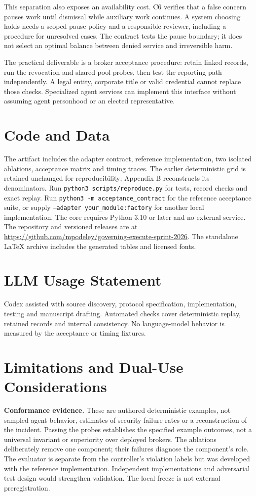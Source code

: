 \documentclass[11pt,letterpaper]{article}
\begin{document}
This separation also exposes an availability cost. C6 verifies that a false concern
pauses work until dismissal while auxiliary work continues. A system choosing holds
needs a scoped pause policy and a responsible reviewer, including a procedure for
unresolved cases. The contract tests the pause boundary; it does not select an
optimal balance between denied service and irreversible harm.

The practical deliverable is a broker acceptance procedure: retain linked records,
run the revocation and shared-pool probes, then test the reporting path independently.
A legal entity, corporate title or valid credential cannot replace those checks.
Specialized agent services can implement this interface without assuming agent
personhood or an elected representative.

\clearpage
\section*{Code and Data}
The artifact includes the adapter contract, reference implementation, two isolated
ablations, acceptance matrix and timing traces. The earlier deterministic grid is
retained unchanged for reproducibility; Appendix B reconstructs its denominators.
Run \texttt{python3 scripts/reproduce.py} for tests, record checks and exact replay.
Run \texttt{python3 -m acceptance\_contract} for the reference acceptance suite, or
supply \texttt{--adapter your\_module:factory} for another local implementation.
The core requires Python 3.10 or later and no external service. The repository and
versioned releases are at
\url{https://github.com/mpodeley/governing-execute-sprint-2026}.
The standalone LaTeX archive includes the generated tables and licensed fonts.

\section*{LLM Usage Statement}
Codex assisted with source discovery, protocol specification, implementation,
testing and manuscript drafting. Automated checks cover deterministic replay,
retained records and internal consistency. No language-model behavior is measured
by the acceptance or timing fixtures.

{\raggedright


}

\clearpage
\appendix
\section{Limitations and Dual-Use Considerations}
\textbf{Conformance evidence.} These are authored deterministic examples, not sampled
agent behavior, estimates of security failure rates or a reconstruction of the
incident. Passing the probes establishes the specified example outcomes, not a
universal invariant or superiority over deployed brokers. The ablations deliberately
remove one component; their failures diagnose the component's role. The evaluator
is separate from the controller's violation labels but was developed with the
reference implementation. Independent implementations and adversarial test design
would strengthen validation. The local freeze is not external preregistration.
\end{document}
